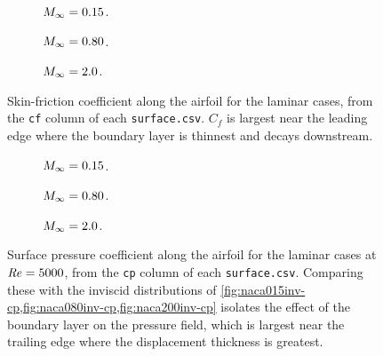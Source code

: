 \begin{figure}[htbp]
  \centering
  \begin{subfigure}{0.32\textwidth}\centering
    \caption{$M_\infty=0.15$.}
  \end{subfigure}\hfill
  \begin{subfigure}{0.32\textwidth}\centering
    \caption{$M_\infty=0.80$.}
  \end{subfigure}\hfill
  \begin{subfigure}{0.32\textwidth}\centering
    \caption{$M_\infty=2.0$.}
  \end{subfigure}
  \caption{Skin-friction coefficient along the airfoil for the laminar cases,
  from the \texttt{cf} column of each \texttt{surface.csv}. $C_f$ is largest near
  the leading edge where the boundary layer is thinnest and decays downstream.}
  \label{fig:naca-lam-cf}
\end{figure}

\begin{figure}[htbp]
  \centering
  \begin{subfigure}{0.32\textwidth}\centering
    \caption{$M_\infty=0.15$.}
  \end{subfigure}\hfill
  \begin{subfigure}{0.32\textwidth}\centering
    \caption{$M_\infty=0.80$.}
  \end{subfigure}\hfill
  \begin{subfigure}{0.32\textwidth}\centering
    \caption{$M_\infty=2.0$.}
  \end{subfigure}
  \caption{Surface pressure coefficient along the airfoil for the laminar cases
  at $\mathit{Re}=5000$, from the \texttt{cp} column of each \texttt{surface.csv}.
  Comparing these with the inviscid distributions of
  \cref{fig:naca015inv-cp,fig:naca080inv-cp,fig:naca200inv-cp} isolates the effect
  of the boundary layer on the pressure field, which is largest near the trailing
  edge where the displacement thickness is greatest.}
  \label{fig:naca-lam-cp}
\end{figure}


